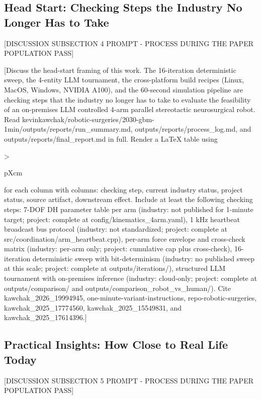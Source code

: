 \subsection{Head Start: Checking Steps the Industry No Longer Has to Take}
\label{sec:discussion-headstart}

[DISCUSSION SUBSECTION 4 PROMPT - PROCESS DURING THE PAPER POPULATION PASS]

[Discuss the head-start framing of this work. The 16-iteration
deterministic sweep, the 4-entity LLM tournament, the cross-platform
build recipes (Linux, MacOS, Windows, NVIDIA A100), and the
60-second simulation pipeline are checking steps that the industry no
longer has to take to evaluate the feasibility of an on-premises LLM
controlled 4-arm parallel stereotactic neurosurgical robot. Read
kevinkawchak/robotic-surgeries/2030-gbm-1min/outputs/reports/run_summary.md,
outputs/reports/process_log.md, and outputs/reports/final_report.md
in full. Render a LaTeX table using
{>{\raggedright\arraybackslash}p{Xcm}} for each column with columns:
checking step, current industry status, project status, source
artifact, downstream effect. Include at least the following checking
steps: 7-DOF DH parameter table per arm (industry: not published for
1-minute target; project: complete at config/kinematics_4arm.yaml),
1 kHz heartbeat broadcast bus protocol (industry: not standardized;
project: complete at src/coordination/arm_heartbeat.cpp), per-arm
force envelope and cross-check matrix (industry: per-arm only;
project: cumulative cap plus cross-check), 16-iteration deterministic
sweep with bit-determinism (industry: no published sweep at this
scale; project: complete at outputs/iterations/), structured LLM
tournament with on-premises inference (industry: cloud-only; project:
complete at outputs/comparison/ and outputs/comparison_robot_vs_human/).
Cite kawchak_2026_19994945, one-minute-variant-instructions,
repo-robotic-surgeries, kawchak_2025_17774560, kawchak_2025_15549831,
and kawchak_2025_17614396.]

\subsection{Practical Insights: How Close to Real Life Today}
\label{sec:discussion-practical}

[DISCUSSION SUBSECTION 5 PROMPT - PROCESS DURING THE PAPER POPULATION PASS]

